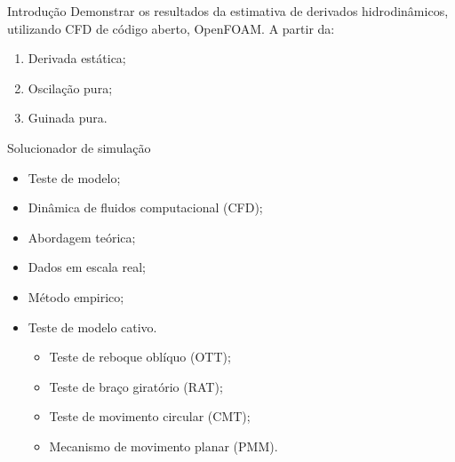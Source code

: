 \begin{frame}[t]{Introdução} 
    Demonstrar os resultados da estimativa de derivados hidrodinâmicos, utilizando CFD de código aberto, OpenFOAM.
    A partir da:
                \begin{enumerate}
                    \item Derivada estática;
                    \item Oscilação pura;
                    \item Guinada pura.
                \end{enumerate}
            
\end{frame}
\begin{frame}[t]{Solucionador de simulação}
    \begin{itemize}
        \item Teste de modelo;
        \item Dinâmica de fluidos computacional (CFD);
        \item Abordagem teórica;
        \item Dados em escala real;
        \item Método empirico;
        \item Teste de modelo cativo.
        \begin{itemize}
            \item Teste de reboque oblíquo (OTT);
            \item Teste de braço giratório (RAT);
            \item Teste de movimento circular (CMT);
            \item Mecanismo de movimento planar (PMM).
        \end{itemize}
    \end{itemize}
   
\end{frame}

